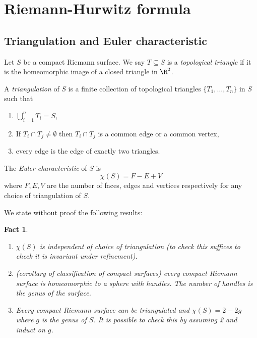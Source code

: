 \documentclass[a4paper]{article}
\newtheorem*{fact}{Fact}
\begin{document}
\section{Riemann-Hurwitz formula}

\subsection{Triangulation and Euler characteristic}

Let \(S\) be a compact Riemann surface. We say \(T \subseteq S\) is a \emph{topological triangle} if it is the homeomorphic image of a closed triangle in \(\R^2\).

\begin{definition}[triangulation]
  A \emph{triangulation} of \(S\) is a finite collection of topological triangles \(\{T_1, \dots, T_n\}\) in \(S\) such that
  \begin{enumerate}
  \item \(\bigcup_{i = 1}^n T_i = S\),
  \item If \(T_i \cap T_j \neq \emptyset\) then \(T_i \cap T_j\) is a common edge or a common vertex,
  \item every edge is the edge of exactly two triangles.
  \end{enumerate}
\end{definition}

\begin{definition}
  The \emph{Euler characteristic} of \(S\) is
  \[
    \chi(S) = F - E + V
  \]
  where \(F, E, V\) are the number of faces, edges and vertices respectively for any choice of triangulation of \(S\).
\end{definition}

We state without proof the following results:
\begin{fact}\leavevmode
  \begin{enumerate}
  \item \(\chi(S)\) is independent of choice of triangulation (to check this suffices to check it is invariant under refinement).
  \item (corollary of classification of compact surfaces) every compact Riemann surface is homeomorphic to a sphere with handles. The number of handles is the \emph{genus} of the surface.
  \item Every compact Riemann surface can be triangulated and \(\chi(S) = 2 - 2g\) where \(g\) is the genus of \(S\). It is possible to check this by assuming 2 and induct on \(g\).
  \end{enumerate}
\end{fact}
\end{document}
